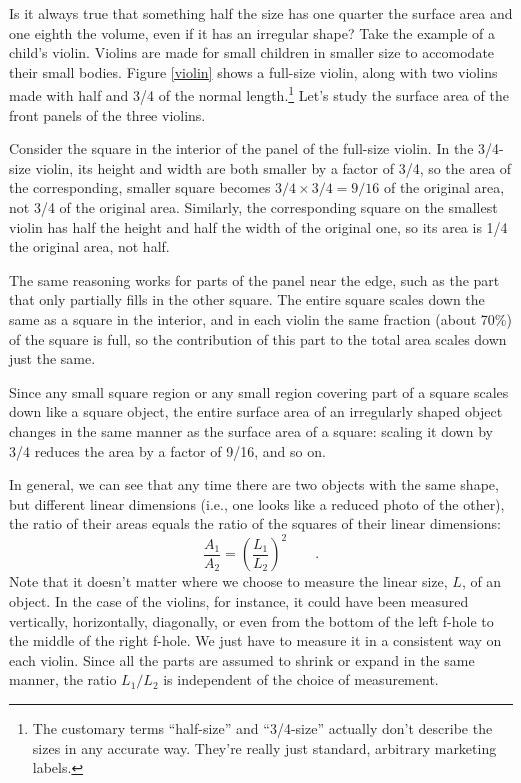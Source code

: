 Is it always true that something half the size has one
quarter the surface area and one eighth the volume, even if
it has an irregular shape? Take the example of a child's
violin. Violins are made for small children in smaller size
to accomodate their small bodies. Figure \ref{violin} shows
a full-size violin, along with two
violins made with half and 3/4 of the normal length.\footnote{The customary
terms ``half-size'' and ``3/4-size'' actually don't describe the
sizes in any accurate way. They're really just standard, arbitrary
marketing labels.}
Let's study the surface area of the front
panels of the three violins.

Consider the square in the interior of the panel of the
full-size violin. In the 3/4-size violin, its height and
width are both smaller by a factor of 3/4, so the area of
the corresponding, smaller square becomes $3/4\times3/4=9/16$ of
the original area, not 3/4 of the original area. Similarly,
the corresponding square on the smallest violin has half the
height and half the width of the original one, so its area
is 1/4 the original area, not half.

The same reasoning works for parts of the panel near the
edge, such as the part that only partially fills in the
other square. The entire square scales down the same as a
square in the interior, and in each violin the same fraction
(about 70\%) of the square is full, so the contribution of
this part to the total area scales down just the same.


Since any small square region or any small region covering
part of a square scales down like a square object, the
entire surface area of an irregularly shaped object changes
in the same manner as the surface area of a square: scaling
it down by 3/4 reduces the area by a factor of 9/16, and so on.

In general, we can see that any time there are two objects
with the same shape, but different linear dimensions (i.e.,
one looks like a reduced photo of the other), the ratio of
their areas equals the ratio of the squares of their linear dimensions:
\begin{equation*}
 \frac{A_1}{A_2} = \left(\frac{L_1}{L_2}\right)^2 \qquad .
\end{equation*}
Note that it doesn't matter where we choose to measure the
linear size, $L$, of an object. In the case of the violins,
for instance, it could have been measured vertically,
horizontally, diagonally, or even from the bottom of the
left f-hole to the middle of the right f-hole. We just have
to measure it in a consistent way on each violin. Since all
the parts are assumed to shrink or expand in the same
manner, the ratio $L_1/L_2$ is independent of the choice of measurement.


